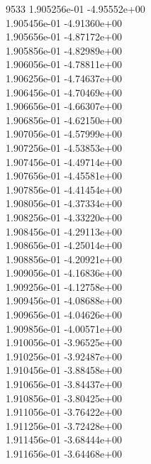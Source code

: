 9533	1.905256e-01	-4.95552e+00	\\ 	1.905456e-01	-4.91360e+00	\\ 	1.905656e-01	-4.87172e+00	\\ 	1.905856e-01	-4.82989e+00	\\ 	1.906056e-01	-4.78811e+00	\\ 	1.906256e-01	-4.74637e+00	\\ 	1.906456e-01	-4.70469e+00	\\ 	1.906656e-01	-4.66307e+00	\\ 	1.906856e-01	-4.62150e+00	\\ 	1.907056e-01	-4.57999e+00	\\ 	1.907256e-01	-4.53853e+00	\\ 	1.907456e-01	-4.49714e+00	\\ 	1.907656e-01	-4.45581e+00	\\ 	1.907856e-01	-4.41454e+00	\\ 	1.908056e-01	-4.37334e+00	\\ 	1.908256e-01	-4.33220e+00	\\ 	1.908456e-01	-4.29113e+00	\\ 	1.908656e-01	-4.25014e+00	\\ 	1.908856e-01	-4.20921e+00	\\ 	1.909056e-01	-4.16836e+00	\\ 	1.909256e-01	-4.12758e+00	\\ 	1.909456e-01	-4.08688e+00	\\ 	1.909656e-01	-4.04626e+00	\\ 	1.909856e-01	-4.00571e+00	\\ 	1.910056e-01	-3.96525e+00	\\ 	1.910256e-01	-3.92487e+00	\\ 	1.910456e-01	-3.88458e+00	\\ 	1.910656e-01	-3.84437e+00	\\ 	1.910856e-01	-3.80425e+00	\\ 	1.911056e-01	-3.76422e+00	\\ 	1.911256e-01	-3.72428e+00	\\ 	1.911456e-01	-3.68444e+00	\\ 	1.911656e-01	-3.64468e+00	\\ \hline
